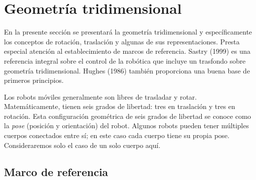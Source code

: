 \section{Geometría tridimensional}
En la presente sección se presentará la geometría tridimensional y específicamente los conceptos de rotación, traslación y algunas de sus representaciones. Presta especial atención al establecimiento de marcos de referencia. {\big Sastry (1999)} es una referencia integral sobre el control de la robótica que incluye un trasfondo sobre geometría tridimensional. {\big Hughes (1986)} también proporciona una buena base de primeros principios.

Los robots móviles generalmente son libres de trasladar y rotar. Matemáticamente, tienen seis grados de libertad: tres en traslación y tres en rotación. Esta configuración geométrica de seis grados de libertad se conoce como la \textit{pose} (posición y orientación) del robot. Algunos robots pueden tener múltiples cuerpos conectados entre sí; en este caso cada cuerpo tiene su propia pose. Consideraremos solo el caso de un solo cuerpo aquí.

\subsection{Marco de referencia}

